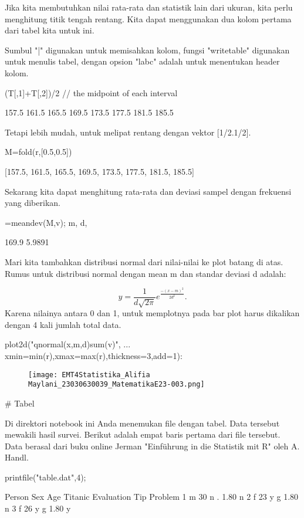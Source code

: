 \documentclass{article}
\begin{document}
Jika kita membutuhkan nilai rata-rata dan statistik lain dari ukuran,
kita perlu menghitung titik tengah rentang. Kita dapat menggunakan dua
kolom pertama dari tabel kita untuk ini.


Sumbul "|" digunakan untuk memisahkan kolom, fungsi "writetable"
digunakan untuk menulis tabel, dengan opsion "labc" adalah untuk
menentukan header kolom.


\>(T[,1]+T[,2])/2 // the midpoint of each interval


        157.5 
        161.5 
        165.5 
        169.5 
        173.5 
        177.5 
        181.5 
        185.5 

Tetapi lebih mudah, untuk melipat rentang dengan vektor [1/2.1/2].


\>M=fold(r,[0.5,0.5])


    [157.5,  161.5,  165.5,  169.5,  173.5,  177.5,  181.5,  185.5]

Sekarang kita dapat menghitung rata-rata dan deviasi sampel dengan
frekuensi yang diberikan.


=meandev(M,v); m, d,


    169.9
    5.9891

Mari kita tambahkan distribusi normal dari nilai-nilai ke plot batang
di atas. Rumus untuk distribusi normal dengan mean m dan standar
deviasi d adalah:


$$y=\frac{1}{d\sqrt{2\pi}}e^{\frac{-(x-m)^2}{2d^2}}.$$Karena nilainya antara 0 dan 1, untuk memplotnya pada bar plot harus
dikalikan dengan 4 kali jumlah total data.


\>plot2d("qnormal(x,m,d)\*sum(v)", ...  
\>     xmin=min(r),xmax=max(r),thickness=3,add=1):


\begin{figure}
    \centering
    \texttt{[image: EMT4Statistika\_Alifia Maylani\_23030630039\_MatematikaE23-003.png]}
    \caption{}
    \label{fig:enter-label}
\end{figure}

# Tabel

Di direktori notebook ini Anda menemukan file dengan tabel. Data
tersebut mewakili hasil survei. Berikut adalah empat baris pertama
dari file tersebut. Data berasal dari buku online Jerman "Einführung
in die Statistik mit R" oleh A. Handl.


\>printfile("table.dat",4);


    Person Sex Age Titanic Evaluation Tip Problem
    1 m 30 n . 1.80 n
    2 f 23 y g 1.80 n
    3 f 26 y g 1.80 y
\end{document}
